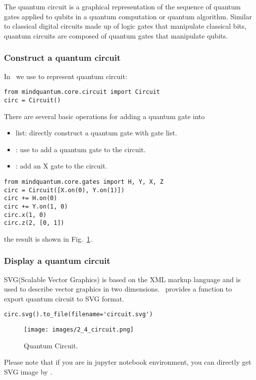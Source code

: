 The quantum circuit is a graphical representation of the sequence of quantum gates applied to qubits in a quantum computation or quantum algorithm. Similar to classical digital circuits made up of logic gates that manipulate classical bits, quantum circuits are composed of quantum gates that manipulate qubits.

\subsubsection{Construct a quantum circuit}
In \MindQuantum\ we use \Circuit to represent quantum circuit:

\begin{lstlisting}
from mindquantum.core.circuit import Circuit
circ = Circuit()
\end{lstlisting}

There are several basic operations for adding a quantum gate into \Circuit
\begin{itemize}
    \item list: directly construct a quantum gate with gate list.
    \item \code{+=}: use \code{+=} to add a quantum gate to the circuit.
    \item {}: add an X gate to the circuit.
\end{itemize}
\begin{lstlisting}
from mindquantum.core.gates import H, Y, X, Z
circ = Circuit([X.on(0), Y.on(1)])
circ += H.on(0)
circ += Y.on(1, 0)
circ.x(1, 0)
circ.z(2, [0, 1])
\end{lstlisting}

the result is shown in Fig.~\ref{fig:Quantum-Circuit}.

\subsubsection{Display a quantum circuit}
SVG(Scalable Vector Graphics) is based on the XML markup language and is used to describe vector graphics in two dimensions. \MindQuantum\ provides a function to export quantum circuit to SVG format.
\begin{lstlisting}
circ.svg().to_file(filename='circuit.svg')
\end{lstlisting}
\begin{figure}[h]
    \begin{center}
        \texttt{[image: images/2\_4\_circuit.png]}
    \end{center}
    \caption{Quantum Circuit.}
    \label{fig:Quantum-Circuit}
\end{figure}
Please note that if you are in jupyter notebook environment, you can directly get SVG image by .


